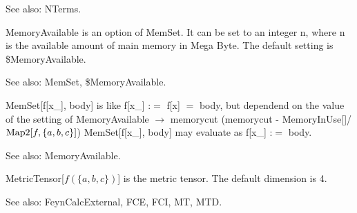 See also:  NTerms.












MemoryAvailable is an option of MemSet. It can be set to an integer n, where n is the available amount of main memory in Mega Byte. The
  default setting is \${}MemoryAvailable.

See also:  MemSet, \${}MemoryAvailable.



MemSet[f[x\_{}], body] is like f[x\_{}] :\(=\) f[x] \(=\) body, but dependend on the value of the setting of MemoryAvailable
  \(\rightarrow \) memorycut (memorycut - MemoryInUse[]/\(\mathrm{Map2}[f,\{a,b,c\}]\)) MemSet[f[x\_{}], body] may evaluate as f[x\_{}] :\(=\)
body.

See also:  MemoryAvailable.



MetricTensor[\(f(\{a,b,c\})\)] is the metric tensor. The default dimension is 4.

See also:  FeynCalcExternal, FCE, FCI, MT, MTD.





\dispSFoutmath{
\mu ,\multsp \nu 
}




